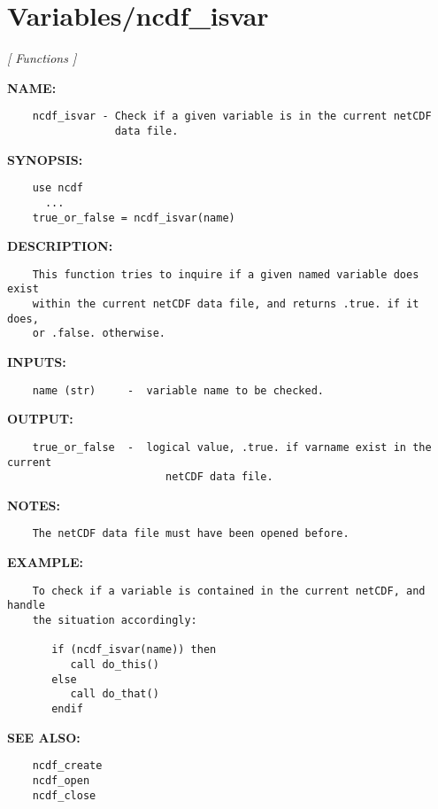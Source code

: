 \section{Variables/ncdf\_isvar}
\textsl{[ Functions ]}

\label{ch:robo116}
\label{ch:Variables_ncdf_isvar}
\textbf{NAME:}\hspace{0.08in}\begin{Verbatim}
    ncdf_isvar - Check if a given variable is in the current netCDF
                 data file.
\end{Verbatim}
\textbf{SYNOPSIS:}\hspace{0.08in}\begin{Verbatim}
    use ncdf
      ...
    true_or_false = ncdf_isvar(name)
\end{Verbatim}
\textbf{DESCRIPTION:}\hspace{0.08in}\begin{Verbatim}
    This function tries to inquire if a given named variable does exist
    within the current netCDF data file, and returns .true. if it does,
    or .false. otherwise.
\end{Verbatim}
\textbf{INPUTS:}\hspace{0.08in}\begin{Verbatim}
    name (str)     -  variable name to be checked.
\end{Verbatim}
\textbf{OUTPUT:}\hspace{0.08in}\begin{Verbatim}
    true_or_false  -  logical value, .true. if varname exist in the current 
                         netCDF data file.
\end{Verbatim}
\textbf{NOTES:}\hspace{0.08in}\begin{Verbatim}
    The netCDF data file must have been opened before.
\end{Verbatim}
\textbf{EXAMPLE:}\hspace{0.08in}\begin{Verbatim}
    To check if a variable is contained in the current netCDF, and handle
    the situation accordingly:

       if (ncdf_isvar(name)) then
          call do_this()
       else
          call do_that()
       endif
\end{Verbatim}
\textbf{SEE ALSO:}\hspace{0.08in}\begin{Verbatim}
    ncdf_create
    ncdf_open
    ncdf_close
\end{Verbatim}
